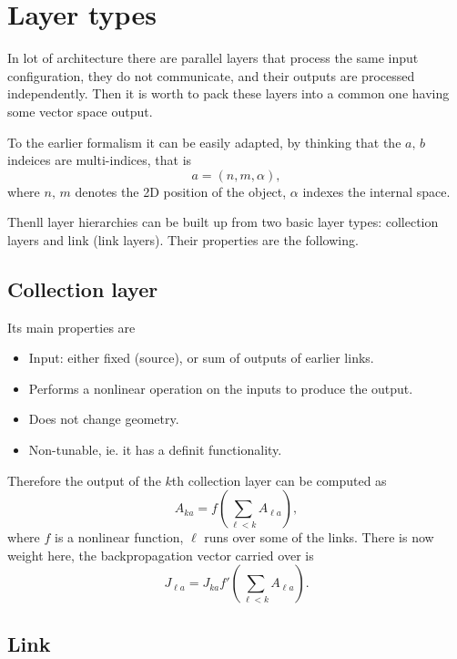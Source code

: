 \documentclass{article}
\begin{document}
\section{Layer types}

In lot of architecture there are parallel layers that process the same
input configuration, they do not communicate, and their outputs are
processed independently. Then it is worth to pack these layers into a
common one having some vector space output.

To the earlier formalism it can be easily adapted, by thinking that
the $a,\,b$ indeices are multi-indices, that is
\begin{equation}
  a = (n,m,\alpha),
\end{equation}
where $n,\,m$ denotes the 2D position of the object, $\alpha$ indexes
the internal space.

Thenll layer hierarchies can be built up from two basic layer types:
collection layers and link (link layers). Their properties are the
following.

\subsection{Collection layer}

Its main properties are
\begin{itemize}
\item Input: either fixed (source), or sum of outputs of earlier links.
\item Performs a nonlinear operation on the inputs to produce the
  output.
\item Does not change geometry.
\item Non-tunable, ie. it has a definit functionality.
\end{itemize}

Therefore the output of the $k$th collection layer can be computed as
\begin{equation}
  A_{ka} = f(\sum_{\ell<k} A_{\ell a}),
\end{equation}
where $f$ is a nonlinear function, $\ell$ runs over some of the
links. There is now weight here, the backpropagation vector carried
over is
\begin{equation}
  J_{\ell a} = J_{ka} f'(\sum_{\ell<k} A_{\ell a}).
\end{equation}

\subsection{Link}
\end{document}
